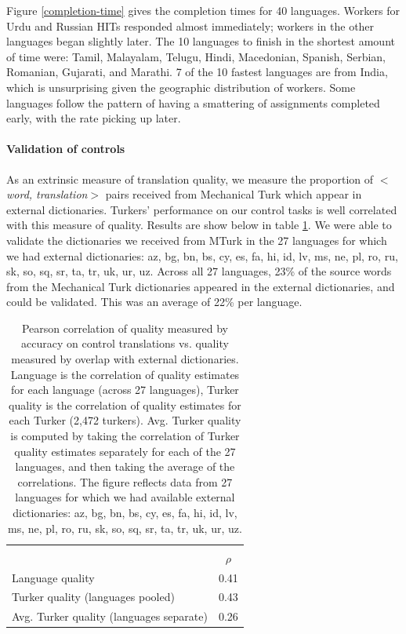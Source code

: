 \documentclass[11pt]{article}
\begin{document}
Figure \ref{completion-time} gives the completion times for 40 languages.  
Workers for Urdu and Russian HITs responded almost immediately; workers in the other languages began slightly later. The 10 languages to finish in the shortest amount of time were: Tamil, Malayalam, Telugu, Hindi, Macedonian, Spanish, Serbian, Romanian, Gujarati, and Marathi. 7 of the 10 fastest languages are from India, which is unsurprising given the geographic distribution of workers.  Some languages follow the pattern of having a smattering of assignments completed early, with the rate picking up later. 

\paragraph{Validation of controls} As an extrinsic measure of translation quality, we measure the proportion of $<${\it word, translation}$>$ pairs received from Mechanical Turk which appear in external dictionaries. Turkers' performance on our control tasks is well correlated with this measure of quality. Results are show below in table \ref{corr-table}. We were able to validate the dictionaries we received from MTurk in the 27 languages for which we had external dictionaries: az, bg, bn, bs, cy, es, fa, hi, id, lv, ms, ne, pl, ro, ru, sk, so, sq, sr, ta, tr, uk, ur, uz. Across all 27 languages, 23\% of the source words from the Mechanical Turk dictionaries appeared in the external dictionaries, and could be validated. This was an average of 22\% per language.

\begin{table}[h]
\centering
\begin{tabular}{lc}\hline\hline\\
&$\rho$\\
Language quality&0.41\\
Turker quality (languages pooled)&0.43\\
Avg. Turker quality (languages separate)&0.26\\
\hline\hline
\end{tabular}
\caption{Pearson correlation of quality measured by accuracy on control translations vs. quality measured by overlap with external dictionaries. Language is the correlation of quality estimates for each language (across 27 languages), Turker quality is the correlation of quality estimates for each Turker (2,472 turkers). Avg. Turker quality is computed by taking the correlation of Turker quality estimates separately for each of the 27 languages, and then taking the average of the correlations. The figure reflects data from 27 languages for which we had available external dictionaries: az, bg, bn, bs, cy, es, fa, hi, id, lv, ms, ne, pl, ro, ru, sk, so, sq, sr, ta, tr, uk, ur, uz.}
\label{corr-table}
\end{table}
\end{document}
